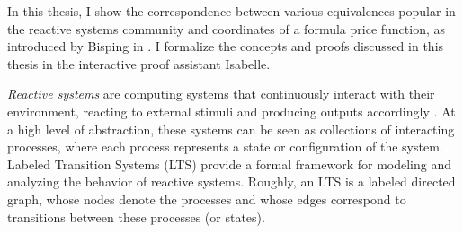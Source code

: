 %
\begin{isabellebody}%
%
%
\isadelimtheory
%
\endisadelimtheory
%
\isatagtheory
%
\endisatagtheory
{\isafoldtheory}%
%
\isadelimtheory
%
\endisadelimtheory
%
\isadelimdocument
%
\endisadelimdocument
%
\isatagdocument
%
\isamarkuptrue%
%
\endisatagdocument
{\isafolddocument}%
%
\isadelimdocument
%
\endisadelimdocument
%
\begin{isamarkuptext}%
In this thesis, I show the correspondence between various equivalences popular in the reactive
systems community and coordinates of a formula price function, as introduced by Bisping in \cite{bisping2023process}. I formalize the concepts and proofs discussed in this thesis in the interactive proof assistant Isabelle.

\textit{Reactive systems} are computing systems that continuously interact with their environment, reacting to external stimuli and producing outputs accordingly \cite{harel85}.
At a high level of abstraction, these systems can be seen as collections of interacting processes, where each process represents a state or configuration of the system. 
Labeled Transition Systems (LTS) \cite{keller76} provide a formal framework for modeling and analyzing the behavior of reactive systems. Roughly, an LTS is a labeled directed graph, whose nodes denote the processes
and whose edges correspond to transitions between these processes (or states).


\end{isamarkuptext}
\end{isabellebody}
